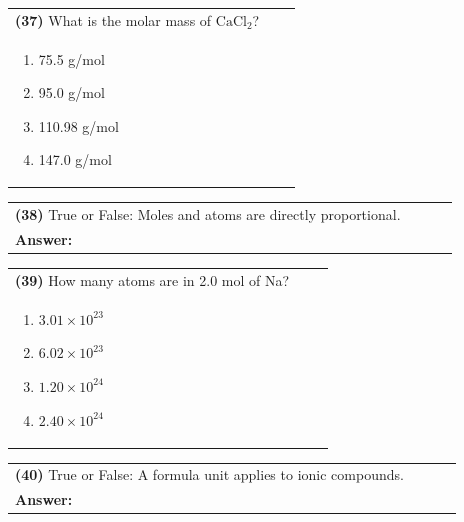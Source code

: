 \documentclass{article}
\begin{document}
{\vspace{0.2cm}
\noindent \begin{tabular}{|p{0.9\linewidth}|}
\hline
\vspace{0.2cm}
\textbf{(37)} What is the molar mass of $\mathrm{CaCl_2}$?\\
\begin{minipage}[t]{0.85\linewidth}
\begin{enumerate}[label=\alph*.]
\item 75.5 g/mol
\item 95.0 g/mol
\item 110.98 g/mol
\item 147.0 g/mol
\end{enumerate}
\end{minipage}\\
\hline
\end{tabular}

\vspace{0.2cm}
\noindent \begin{tabular}{|p{0.9\linewidth}|}
\hline
\vspace{0.2cm}
\textbf{(38)} True or False: Moles and atoms are directly proportional.\\
\textbf{Answer:} \underline{\hspace{2cm}}\\
\hline
\end{tabular}

\vspace{0.2cm}
\noindent \begin{tabular}{|p{0.9\linewidth}|}
\hline
\vspace{0.2cm}
\textbf{(39)} How many atoms are in 2.0 mol of Na?\\
\begin{minipage}[t]{0.85\linewidth}
\begin{enumerate}[label=\alph*.]
\item $3.01\times10^{23}$
\item $6.02\times10^{23}$
\item $1.20\times10^{24}$
\item $2.40\times10^{24}$
\end{enumerate}
\end{minipage}\\
\hline
\end{tabular}

\vspace{0.2cm}
\noindent \begin{tabular}{|p{0.9\linewidth}|}
\hline
\vspace{0.2cm}
\textbf{(40)} True or False: A formula unit applies to ionic compounds.\\
\textbf{Answer:} \underline{\hspace{2cm}}\\
\hline
\end{tabular}
\newpage

}
\end{document}
